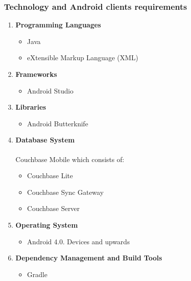 \documentclass[a4paper,10pt]{article}
\begin{document}
	\subsubsection{Technology and Android clients requirements}
\begin{enumerate}
 \item \textbf{Programming Languages}
	\begin{itemize}
		\item Java
		\item eXtensible Markup Language (XML)
	\end{itemize}
\item \textbf{Frameworks}
	\begin{itemize}
		\item Android Studio
	\end{itemize}
\item \textbf{Libraries}
	\begin{itemize}
		\item Android Butterknife
	\end{itemize}
\item \textbf{Database System} \\ \\ 
Couchbase Mobile which consists of:
	\begin{itemize}
 		\item Couchbase Lite
		\item Couchbase Sync Gateway
		\item Couchbase Server
	\end{itemize}
\item \textbf{Operating System}
	\begin{itemize}
 		\item Android 4.0. Devices and upwards
	\end{itemize}
\item \textbf{Dependency Management and Build Tools}
	\begin{itemize}
		\item Gradle
	\end{itemize}
\end{enumerate}
\end{document}
